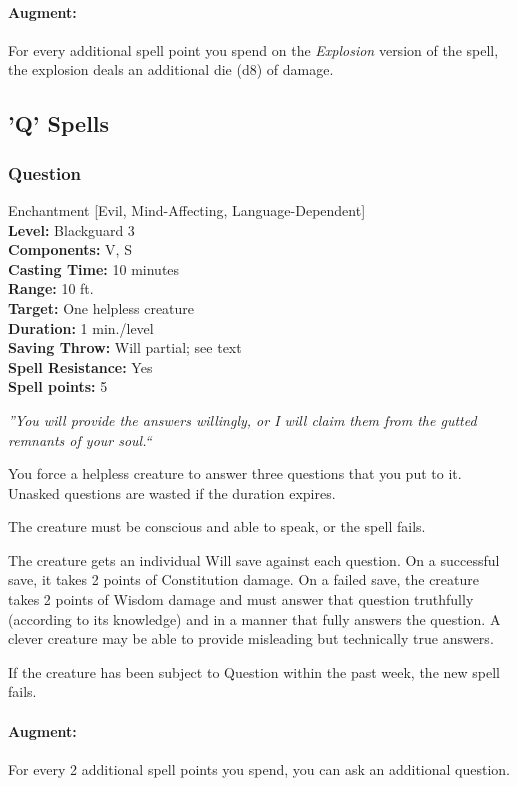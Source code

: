 \paragraph{Augment:} For every additional spell point you spend on the \emph{Explosion} version of the spell, the explosion deals an additional die (d8) of damage.
\subsection{'Q' Spells}
\subsubsection{Question}
\label{Spell:Question}
Enchantment [Evil, Mind-Affecting, Language-Dependent]
\\ \textbf{Level:} Blackguard 3
\\ \textbf{Components:} V, S
\\ \textbf{Casting Time:} 10 minutes
\\ \textbf{Range:} 10 ft.
\\ \textbf{Target:} One helpless creature
\\ \textbf{Duration:} 1 min./level
\\ \textbf{Saving Throw:} Will partial; see text
\\ \textbf{Spell Resistance:} Yes
\\ \textbf{Spell points:} 5

\emph{''You will provide the answers willingly, or I will claim them from the gutted remnants of your soul.``}

You force a helpless creature to answer three questions that you put to it. Unasked questions are wasted if the duration expires.

The creature must be conscious and able to speak, or the spell fails.

The creature gets an individual Will save against each question. On a successful save, it takes 2 points of Constitution damage. On a failed save, the creature takes 2 points of Wisdom damage and must answer that question truthfully (according to its knowledge) and in a manner that fully answers the question. A clever creature may be able to provide misleading but technically true answers.

If the creature has been subject to Question within the past week, the new spell fails. 

\paragraph{Augment:} For every 2 additional spell points you spend, you can ask an additional question.

